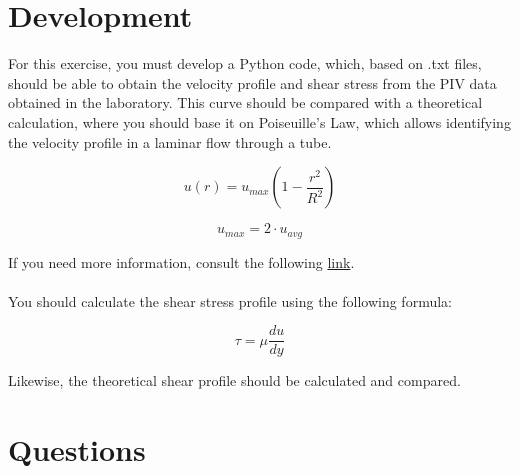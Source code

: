 \documentclass{article} %
\begin{document}
\section{Development}

For this exercise, you must develop a Python code, which, based on .txt files, should be able to obtain the velocity profile and shear stress from the PIV data obtained in the laboratory.
This curve should be compared with a theoretical calculation, where you should base it on Poiseuille's Law, which allows identifying the velocity profile in a laminar flow through a tube.

\begin{equation}
    u(r) = u_{max}(1 - \frac{r^2}{R^2})
\end{equation}

\begin{equation}
    u_{max} = 2 \cdot u_{avg}
\end{equation}

If you need more information, consult the following \href{https://www.simscale.com/docs/validation-cases/hagen-poiseuille-flow/}{link}.
\\ \\
You should calculate the shear stress profile using the following formula:

\begin{equation}
    \tau = \mu \frac{du}{dy}
\end{equation}

Likewise, the theoretical shear profile should be calculated and compared.

\newpage
\section{Questions}
\end{document}
